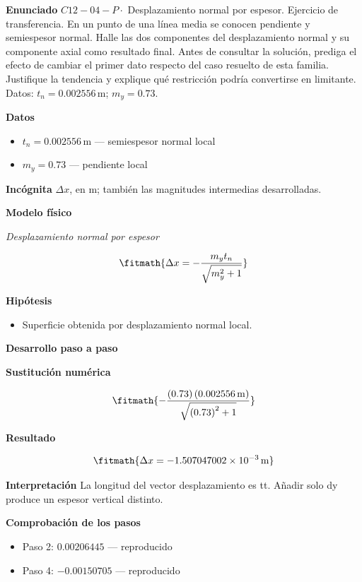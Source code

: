 \documentclass[10pt,openany]{book}
\begin{document}
\noindent\textbf{Enunciado}
\(C12-04-P \cdot\) Desplazamiento normal por espesor. Ejercicio de transferencia. En un punto de una línea media se conocen pendiente y semiespesor normal. Halle las dos componentes del desplazamiento normal y su componente axial como resultado final. Antes de consultar la solución, prediga el efecto de cambiar el primer dato respecto del caso resuelto de esta familia. Justifique la tendencia y explique qué restricción podría convertirse en limitante. Datos: \(t_n=0.002556\, \mathrm{m}\); \(m_y=0.73\).

\noindent\textbf{Datos}
\begin{itemize}
\item $t_n = 0.002556\,\mathrm{m}$ — semiespesor normal local
\item $m_y = 0.73$ — pendiente local
\end{itemize}

\noindent\textbf{Incógnita}
$\Delta x$, en $\mathrm{m}$; también las magnitudes intermedias desarrolladas.

\noindent\textbf{Modelo físico}

\noindent\textit{Desplazamiento normal por espesor}

\[
\fitmath{\Delta x=- \frac{m_y t_n}{\sqrt{m_y^{2} + 1}}}
\]

\noindent\textbf{Hipótesis}
\begin{itemize}
\item Superficie obtenida por desplazamiento normal local.
\end{itemize}

\noindent\textbf{Desarrollo paso a paso}



\noindent\textbf{Sustitución numérica}

\[
\fitmath{- \frac{\left(0.73\right) \left(0.002556\,\mathrm{m}\right)}{\sqrt{\left(0.73\right)^{2} + 1}}}
\]

\noindent\textbf{Resultado}

\[
\fitmath{\Delta x=-1.507047002\times10^{-3}\,\mathrm{m}}
\]

\noindent\textbf{Interpretación}
La longitud del vector desplazamiento es tt. Añadir solo dy produce un espesor vertical distinto.

\noindent\textbf{Comprobación de los pasos}
\begin{itemize}
\item Paso 2: $0.00206445$ — reproducido
\item Paso 4: $-0.00150705$ — reproducido
\end{itemize}
\end{document}
